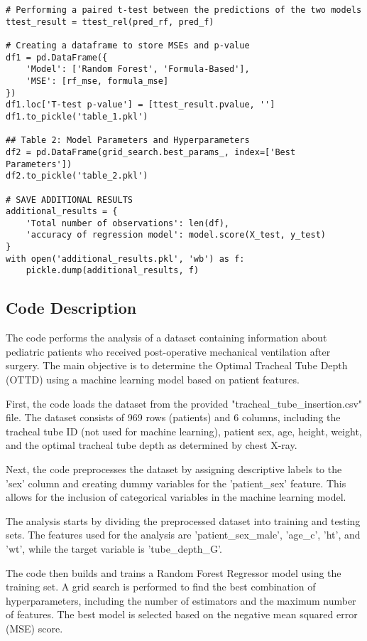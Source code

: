 \documentclass[11pt]{article}
\begin{document}
\begin{verbatim}
# Performing a paired t-test between the predictions of the two models
ttest_result = ttest_rel(pred_rf, pred_f)

# Creating a dataframe to store MSEs and p-value
df1 = pd.DataFrame({
    'Model': ['Random Forest', 'Formula-Based'],
    'MSE': [rf_mse, formula_mse]
})
df1.loc['T-test p-value'] = [ttest_result.pvalue, '']
df1.to_pickle('table_1.pkl')

## Table 2: Model Parameters and Hyperparameters
df2 = pd.DataFrame(grid_search.best_params_, index=['Best Parameters'])
df2.to_pickle('table_2.pkl')

# SAVE ADDITIONAL RESULTS
additional_results = {
    'Total number of observations': len(df),
    'accuracy of regression model': model.score(X_test, y_test)
}
with open('additional_results.pkl', 'wb') as f:
    pickle.dump(additional_results, f)

\end{verbatim}

\subsection{Code Description}

The code performs the analysis of a dataset containing information about pediatric patients who received post-operative mechanical ventilation after surgery. The main objective is to determine the Optimal Tracheal Tube Depth (OTTD) using a machine learning model based on patient features.

First, the code loads the dataset from the provided "tracheal\_tube\_insertion.csv" file. The dataset consists of 969 rows (patients) and 6 columns, including the tracheal tube ID (not used for machine learning), patient sex, age, height, weight, and the optimal tracheal tube depth as determined by chest X-ray.

Next, the code preprocesses the dataset by assigning descriptive labels to the 'sex' column and creating dummy variables for the 'patient\_sex' feature. This allows for the inclusion of categorical variables in the machine learning model.

The analysis starts by dividing the preprocessed dataset into training and testing sets. The features used for the analysis are 'patient\_sex\_male', 'age\_c', 'ht', and 'wt', while the target variable is 'tube\_depth\_G'.

The code then builds and trains a Random Forest Regressor model using the training set. A grid search is performed to find the best combination of hyperparameters, including the number of estimators and the maximum number of features. The best model is selected based on the negative mean squared error (MSE) score.
\end{document}

